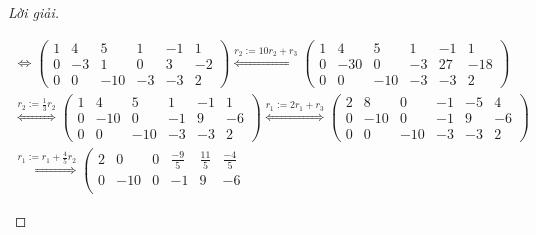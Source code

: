 \begin{proof}[Lời giải]
\begin{enumerate}[label = (\alph*)]
\begin{gather*}
{                  }{\Longleftrightarrow}
                  \left(\begin{array}{ccc|ccc}
                          1 & 4  & 5   & 1  & -1 & 1  \\
                          0 & -3 & 1   & 0  & 3  & -2 \\
                          0 & 0  & -10 & -3 & -3 & 2
                      \end{array}
                  \right)
                  \stackrel{
                      r_{2}:= 10r_{2} + r_{3}
                  }{\Longleftrightarrow}
                  \left(\begin{array}{ccc|ccc}
                          1 & 4   & 5   & 1  & -1 & 1   \\
                          0 & -30 & 0   & -3 & 27 & -18 \\
                          0 & 0   & -10 & -3 & -3 & 2
                      \end{array}
                  \right) \\
                  \stackrel{
                  r_{2}:= \frac{1}{3}r_{2}
                  }{\Longleftrightarrow}
                  \left(\begin{array}{ccc|ccc}
                          1 & 4   & 5   & 1  & -1 & 1  \\
                          0 & -10 & 0   & -1 & 9  & -6 \\
                          0 & 0   & -10 & -3 & -3 & 2
                      \end{array}
                  \right)
                  \stackrel{
                      r_{1}:= 2r_{1} + r_{3}
                  }{\Longleftrightarrow}
                  \left(\begin{array}{ccc|ccc}
                          2 & 8   & 0   & -1 & -5 & 4  \\
                          0 & -10 & 0   & -1 & 9  & -6 \\
                          0 & 0   & -10 & -3 & -3 & 2
                      \end{array}
                  \right) \\
                  \stackrel{
                  r_{1}:= r_{1} + \frac{4}{5}r_{2}
                  }{\Longleftrightarrow}
                  \left(\begin{array}{ccc|ccc}
                          2 & 0   & 0   & \frac{-9}{5} & \frac{11}{5} & \frac{-4}{5} \\
                          0 & -10 & 0   & -1           & 9            & -6           \\

\end{array}
\end{gather*}
\end{enumerate}
\end{proof}
